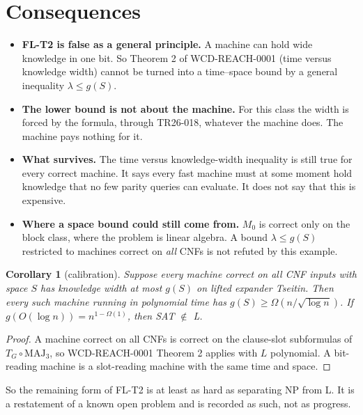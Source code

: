 \documentclass[11pt]{article}
\newtheorem{corollary}[theorem]{Corollary}
\begin{document}
\section{Consequences}
\begin{itemize}
\item \textbf{FL-T2 is false as a general principle.} A machine can hold wide knowledge in one bit. So Theorem 2 of WCD-REACH-0001 (time versus knowledge width) cannot be turned into a time--space bound by a general inequality $\lambda\le g(S)$.
\item \textbf{The lower bound is not about the machine.} For this class the width is forced by the formula, through TR26-018, whatever the machine does. The machine pays nothing for it.
\item \textbf{What survives.} The time versus knowledge-width inequality is still true for every correct machine. It says every fast machine must at some moment hold knowledge that no few parity queries can evaluate. It does not say that this is expensive.
\item \textbf{Where a space bound could still come from.} $M_0$ is correct only on the block class, where the problem is linear algebra. A bound $\lambda\le g(S)$ restricted to machines correct on \emph{all} CNFs is not refuted by this example.
\end{itemize}

\begin{corollary}[calibration]\label{cor:L}
Suppose every machine correct on all CNF inputs with space $S$ has knowledge width at most $g(S)$ on lifted expander Tseitin. Then every such machine running in polynomial time has $g(S)\ge\Omega(n/\sqrt{\log n})$. If $g(O(\log n))=n^{1-\Omega(1)}$, then SAT $\notin$ L.
\end{corollary}
\begin{proof}
A machine correct on all CNFs is correct on the clause-slot subformulas of $T_G\circ\mathrm{MAJ}_3$, so WCD-REACH-0001 Theorem 2 applies with $L$ polynomial. A bit-reading machine is a slot-reading machine with the same time and space.
\end{proof}
So the remaining form of FL-T2 is at least as hard as separating NP from L. It is a restatement of a known open problem and is recorded as such, not as progress.
\end{document}
